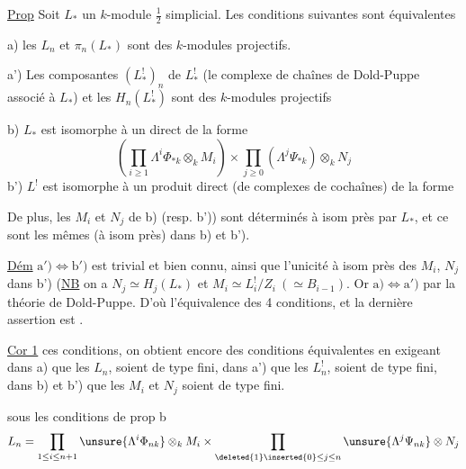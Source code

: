 \uline{Prop} Soit $L_*$ un $k$-module $\frac12$ simplicial.
Les conditions suivantes sont équivalentes

a) les $L_n$ et $\pi_n(L_*)$ sont des $k$-modules
projectifs.

a') Les composantes  $(L^!_*)_n$ de $L^!_*$ (le
complexe de chaînes de Dold-Puppe associé à
$L_*$) et les $H_n(L^!_*)$ sont des $k$-modules
projectifs

b) $L_*$ est isomorphe à un  
direct  de la forme
\[
\left(\prod_{i\geq1}\Lambda^i\Phi_{*k}\otimes_k M_i\right)
\times\prod_{j\geq0}(\Lambda^j\Psi_{*k})\otimes_k N_j
\]
 b') $L^!$ est isomorphe à un produit
direct (de complexes de cochaînes) de
la forme

De plus, les $M_i$ et $N_j$ de b) (resp. b'))
sont déterminés à isom près par  $L_*$,
et ce sont les mêmes (à isom près) dans
b) et b').

\uline{Dém} $\mathrm{a'})\Longleftrightarrow\mathrm{b'})$ est trivial et bien connu,
ainsi que l'unicité à isom  près des
$M_i$, $N_j$ dans b') (\uline{NB} on a $N_j\simeq H_j(L_*)$
et $M_i\simeq L_i^!/Z_i\ (\simeq B_{i-1})$\unsure{*}.
Or $\mathrm a)\Longleftrightarrow\mathrm{a'})$
par la théorie de Dold-Puppe. D'où
l'équivalence des 4 conditions, et la dernière
assertion est .

\uline{Cor 1}   ces conditions, on obtient encore
des conditions équivalentes en
exigeant  dans a) que les $L_n$, 
soient de type fini, dans a') que les
$L_n^!$,  soient de type fini, dans
b) et b') que les $M_i$ et $N_j$ soient de
type fini.

 sous les conditions de prop b
\[
L_n=\prod_{1\leq i\leq n+1}\unsure{\Lambda^i\Phi_{nk}}\otimes_k M_i
\times\prod_{\deleted{1}\inserted{0}\leq j\leq n}\unsure{\Lambda^j\Psi_{nk}}\otimes N_j
\]

